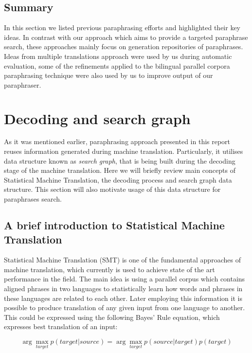 \subsection{Summary}

In this section we listed previous paraphrasing efforts and highlighted their key ideas. In contrast with our approach which aims to provide a targeted paraphrase search, these approaches mainly focus on generation repositories of paraphrases. Ideas from multiple translations approach were used by us during automatic evaluation, some of the refinements applied to the bilingual parallel corpora paraphrasing technique were also used by us to improve output of our paraphraser.



\section{Decoding and search graph}

As it was mentioned earlier, paraphrasing approach presented in this report reuses information generated during machine translation. Particularly, it utilises data structure known as \textit{search graph}, that is being built during the decoding stage of the machine translation. Here we will briefly review main concepts of Statistical Machine Translation, the decoding process and search graph data structure. This section will also motivate usage of this data structure for paraphrases search.

\subsection{A brief introduction to Statistical Machine Translation} 

Statistical Machine Translation (SMT) is one of the fundamental approaches of machine translation, which currently is used to achieve state of the art performance in the field. The main idea is using a parallel corpus which contains aligned phrases in two languages to statistically learn how words and phrases in these languages are related to each other. Later employing this information it is possible to produce translation of any given input from one language to another. This could be expressed using the following Bayes' Rule equation, which expresses best translation of an input:

\begin{large}
\begin{equation}
\arg \max_{target} p(target|source) = \arg \max_{target} p(source|target)p(target)
\end{equation}
\end{large}

